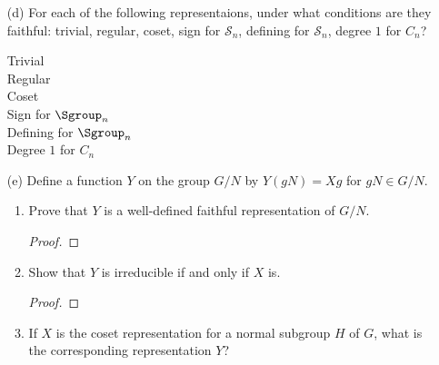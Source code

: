 \documentclass{math174}
\begin{document}
\begin{description}
\begin{enumerate}
  \item[(d)] For each of the following representaions, under what
    conditions are they faithful: trivial, regular, coset, sign for
    \(\mathcal S_n\), defining for \(\mathcal S_n\), degree \(1\) for
    \(C_n\)?

    \begin{solution}
      \begin{description}
      \item[Trivial]
      \item[Regular]
      \item[Coset]
      \item[Sign for \(\Sgroup_n\)]
      \item[Defining for \(\Sgroup_n\)]
      \item[Degree \(1\) for \(C_n\)]
      \end{description}
    \end{solution}

  \item[(e)] Define a function \(Y\) on the group \(G/N\) by
    \(Y(gN) = Xg\) for \(gN \in G/N\).
    \begin{enumerate}
    \setcounter{enumi}{0}
    \item Prove that \(Y\) is a well-defined faithful representation of
      \(G/N\).

      \begin{solution}
        \begin{proof}

        \end{proof}
      \end{solution}

    \setcounter{enumi}{3}
    \item Show that \(Y\) is irreducible if and only if \(X\) is.

      \begin{solution}
        \begin{proof}

        \end{proof}
      \end{solution}

    \setcounter{enumi}{4}
    \item If \(X\) is the coset representation for a normal subgroup
      \(H\) of \(G\), what is the corresponding representation \(Y\)?

      \begin{solution}

      \end{solution}
    \end{enumerate}
  \end{enumerate}
\end{description}
\end{document}

